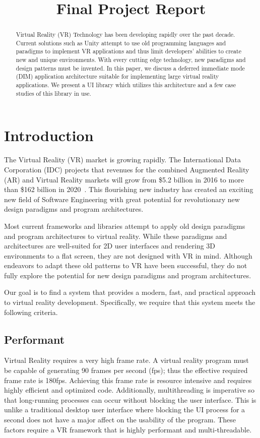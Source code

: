 \documentclass[conference,12pt]{IEEEtran}
\title{Final Project Report}
\author{%
    \IEEEauthorblockN{%
        Jonathan Sumner Evans\IEEEauthorrefmark{1},
        Robinson Merillat\IEEEauthorrefmark{2}, and
        Sam Sartor\IEEEauthorrefmark{3}
    }
    \IEEEauthorblockA{%
        Department of Computer Science,
        Colorado School of Mines\\
        Golden, Colorado\\
        Email:
            \IEEEauthorrefmark{1}jonathanevans@mines.edu,
            \IEEEauthorrefmark{2}rdmerillat@mines.edu,
            \IEEEauthorrefmark{3}ssartor@mines.edu
    }
}
\begin{document}
\maketitle
\begin{abstract}
    Virtual Reality (VR) Technology has been developing rapidly over the past
    decade. Current solutions such as Unity attempt to use old programming
    languages and paradigms to implement VR applications and thus limit
    developers' abilities to create new and unique environments.  With every
    cutting edge technology, new paradigms and design patterns must be invented.
    In this paper, we discuss a deferred immediate mode (DIM) application
    architecture suitable for implementing large virtual reality applications.
    We present a UI library which utilizes this architecture and a few case
    studies of this library in use.
\end{abstract}

\section{Introduction}\label{sec:introduction}
The Virtual Reality (VR) market is growing rapidly. The International Data
Corporation (IDC) projects that revenues for the combined Augmented Reality (AR)
and Virtual Reality markets will grow from \$5.2 billion in 2016 to more than
\$162 billion in 2020~\cite{IDC:2016:VR-industry}. This flourishing new industry
has created an exciting new field of Software Engineering with great potential
for revolutionary new design paradigms and program architectures.

Most current frameworks and libraries attempt to apply old design paradigms and
program architectures to virtual reality. While these paradigms and
architectures are well-suited for 2D user interfaces and rendering 3D
environments to a flat screen, they are not designed with VR in mind. Although
endeavors to adapt these old patterns to VR have been successful, they do not
fully explore the potential for new design paradigms and program architectures.

Our goal is to find a system that provides a modern, fast, and practical
approach to virtual reality development. Specifically, we require that this
system meets the following criteria.

\subsection{Performant}\label{sec:performant}
Virtual Reality requires a very high frame rate. A virtual reality program must
be capable of generating 90 frames per second (fps); thus the effective required
frame rate is 180fps.  Achieving this frame rate is resource intensive and
requires highly efficient and optimized code. Additionally, multithreading is
imperative so that long-running processes can occur without blocking the user
interface. This is unlike a traditional desktop user interface where blocking
the UI process for a second does not have a major affect on the usability of the
program. These factors require a VR framework that is highly performant and
multi-threadable.
\end{document}
